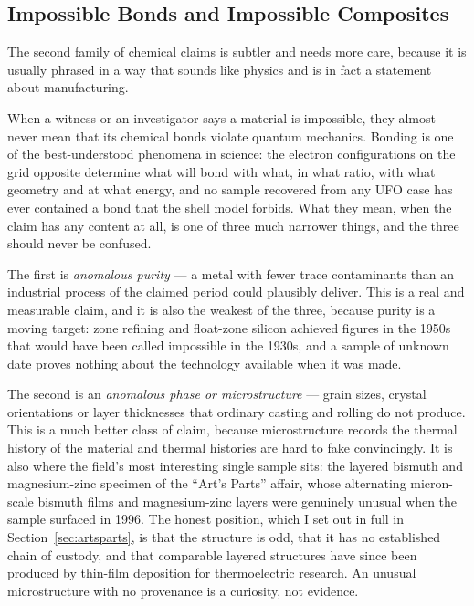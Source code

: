 \subsection{Impossible Bonds and Impossible Composites}

The second family of chemical claims is subtler and needs more care, because it is usually
phrased in a way that sounds like physics and is in fact a statement about manufacturing.

When a witness or an investigator says a material is impossible, they almost never mean that its
chemical bonds violate quantum mechanics. Bonding is one of the best-understood phenomena in
science: the electron configurations on the grid opposite determine what will bond with what, in
what ratio, with what geometry and at what energy, and no sample recovered from any UFO case has
ever contained a bond that the shell model forbids. What they mean, when the claim has any
content at all, is one of three much narrower things, and the three should never be confused.

The first is \emph{anomalous purity} --- a metal with fewer trace contaminants than an industrial
process of the claimed period could plausibly deliver. This is a real and measurable claim, and
it is also the weakest of the three, because purity is a moving target: zone refining and
float-zone silicon achieved figures in the 1950s that would have been called impossible in the
1930s, and a sample of unknown date proves nothing about the technology available when it was
made.

The second is an \emph{anomalous phase or microstructure} --- grain sizes, crystal orientations
or layer thicknesses that ordinary casting and rolling do not produce. This is a much better
class of claim, because microstructure records the thermal history of the material and thermal
histories are hard to fake convincingly. It is also where the field's most interesting single
sample sits: the layered bismuth and magnesium-zinc specimen of the ``Art's Parts'' affair, whose
alternating micron-scale bismuth films and magnesium-zinc layers were genuinely unusual when the
sample surfaced in 1996. The honest position, which I set out in full in
Section~\ref{sec:artsparts}, is that the structure is odd, that it has no established chain of
custody, and that comparable layered structures have since been produced by thin-film deposition
for thermoelectric research. An unusual microstructure with no provenance is a curiosity, not
evidence.

